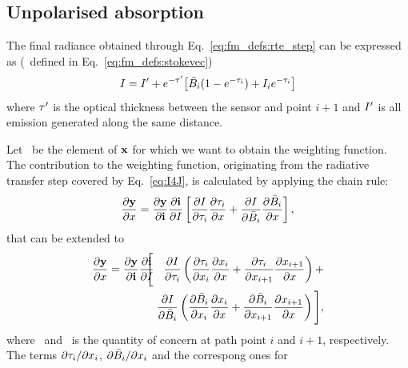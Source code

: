 \subsection{Unpolarised absorption}
%
The final radiance obtained through Eq.~\ref{eq:fm_defs:rte_step} can be
expressed as (\StoI\ defined in Eq.~\ref{eq:fm_defs:stokevec})
\begin{equation}
  \label{eq:I4J}
  I = I'+ e^{-\tau'}\!\left[ \bar{B}_i(1-e^{-\tau_{i}}) + 
                                         I_{i}e^{-\tau_{i}} \right]
\end{equation}
where $\tau'$ is the optical thickness between the sensor and point $i+1$ and
$I'$ is all emission generated along the same distance.

Let \SttElm\ be the element of $\mathbf{x}$ for which we want to obtain the
weighting function. The contribution to the weighting function,
originating from the radiative transfer step covered by Eq.~\ref{eq:I4J}, is
calculated by applying the chain rule:
\begin{equation}
  \frac{\partial\mathbf{y}}{\partial x} =  
  \frac{\partial\mathbf{y}}{\partial\mathbf{i}}
  \frac{\partial\mathbf{i}}{\partial I} 
  \left[
  \frac{\partial I}{\partial\tau_{i}}\frac{\partial\tau_{i}}{\partial x} + 
  \frac{\partial I}{\partial\bar{B}_i}
  \frac{\partial\bar{B}_i}{\partial x} \right],
\end{equation}
that can be extended to
\begin{eqnarray}
  \frac{\PartD\MsrVct}{\PartD\SttElm} =  
  \frac{\PartD\MsrVct}{\PartD\MpiVct}
  \frac{\PartD\MpiVct}{\PartD\StoI} 
  \!\!\!\!&\Bigg[&\!\!\!\!
    \frac{\PartD\StoI}{\PartD\aOth{i}}
      \left(
        \frac{\PartD\aOth{i}}{\PartD\aSttElm{i}}
        \frac{\PartD\aSttElm{i}}{\PartD\SttElm} + 
        \frac{\PartD\aOth{i}}{\PartD\aSttElm{i+1}}  
        \frac{\PartD\aSttElm{i+1}}{\PartD\SttElm} 
      \right) + \nonumber\\ && \!\!\!\!
    \frac{\PartD\StoI}{\PartD\bar{\Planck}_i}
      \left(
        \frac{\PartD\bar{\Planck}_i}{\PartD\aSttElm{i}}
        \frac{\PartD\aSttElm{i}}{\PartD\SttElm} + 
        \frac{\PartD\bar{\Planck}_i}{\PartD\aSttElm{i+1}}  
        \frac{\PartD\aSttElm{i+1}}{\PartD\SttElm}
     \right)
  \Bigg],  
  \label{eq:chainrule1}
\end{eqnarray}
where \ and \ is the quantity of concern at path point
$i$ and $i+1$, respectively. The terms $\partial\tau_{i}/\partial x_{i}$,
$\partial\bar{B}_i/\partial x_{i}$ and the correspong ones for
